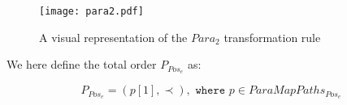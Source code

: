 \begin{figure}[H]
	\centering
	\texttt{[image: para2.pdf]}
	\caption{A visual representation of the $Para_2$ transformation rule}
	\label{fig:para2}
\end{figure}

We here define the total order $P_{Pos_e}$ as:

\[P_{Pos_e} = (p[1], \prec), \texttt{ where } p \in ParaMapPaths_{Pos_e} \]


